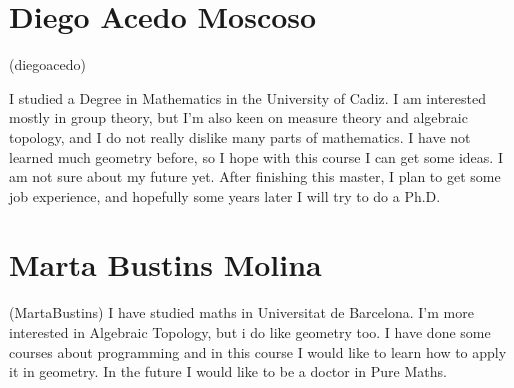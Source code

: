 \documentclass[11pt]{amsart}
\begin{document}
\section*{Diego Acedo Moscoso}
(diegoacedo)

I studied a Degree in Mathematics in the University of Cadiz. I am interested mostly in group theory, but I'm also keen on measure theory and algebraic topology, and I do not really dislike many parts of mathematics. I have not learned much geometry before, so I hope with this course I can get some ideas.
I am not sure about my future yet. After finishing this master, I plan to get some job experience, and hopefully some years later I will try to do a Ph.D.

\medskip

\section*{Marta Bustins Molina} 
(MartaBustins) 
I have studied maths in Universitat de Barcelona. I'm more interested in Algebraic Topology, but i do like geometry too. I have done some courses about programming and in this course I would like to learn how to apply it in geometry. In the future I would like to be a doctor in Pure Maths. 
\end{document}
